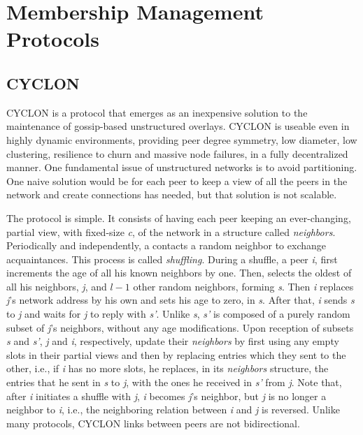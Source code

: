 \documentclass[runningheads]{llncs}
\begin{document}
\section{Membership Management Protocols}
\subsection{CYCLON} CYCLON\cite{cyclon} is a protocol that emerges as an inexpensive solution to the maintenance of gossip-based unstructured overlays. CYCLON is useable even in highly dynamic environments, providing peer degree symmetry, low diameter, low clustering, resilience to churn and massive node failures, in a fully decentralized manner. One fundamental issue of unstructured networks is to avoid partitioning. One naive solution would be for each peer to keep a view of all the peers in the network and create connections has needed, but that solution is not scalable.

The protocol is simple. It consists of having each peer keeping an ever-changing, partial view, with fixed-size \textit{c}, of the network in a structure called \textit{neighbors}. Periodically and independently, a contacts a random neighbor to exchange acquaintances. This process is called \textit{shuffling}. During a shuffle, a peer \textit{i}, first increments the age of all his known neighbors by one. Then, selects the oldest of all his neighbors, \textit{j}, and $l-1$ other random neighbors, forming \textit{s}. Then \textit{i} replaces \textit{j}'s network address by his own and sets his age to zero, in \textit{s}. After that, \textit{i} sends \textit{s} to \textit{j} and waits for \textit{j} to reply with \textit{s'}. Unlike \textit{s}, \textit{s'} is composed of a purely random subset of \textit{j}'s neighbors, without any age modifications. Upon reception of subsets \textit{s} and \textit{s'}, \textit{j} and \textit{i}, respectively, update their \textit{neighbors} by first using any empty slots in their partial views and then by replacing entries which they sent to the other, i.e., if \textit{i} has no more slots, he replaces, in its \textit{neighbors} structure, the entries that he sent in \textit{s} to \textit{j}, with the ones he received in \textit{s'} from \textit{j}. Note that, after \textit{i} initiates a shuffle with \textit{j}, \textit{i} becomes \textit{j}'s neighbor, but \textit{j} is no longer a neighbor to \textit{i}, i.e., the neighboring relation between \textit{i} and \textit{j} is reversed. Unlike many protocols, CYCLON links between peers are not bidirectional.
\end{document}
